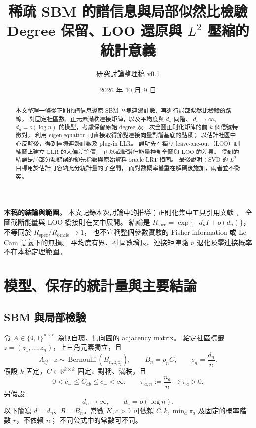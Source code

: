 \documentclass[11pt,a4paper]{article}
\title{\bfseries 稀疏 SBM 的譜信息與局部似然比檢驗\\[7pt]
  \large Degree 保留、LOO 還原與 \(L^2\) 壓縮的統計意義}
\author{研究討論整理稿 \quad v0.1}
\date{2026 年 10 月 9 日}
\theoremstyle{zhplain}
\numberwithin{equation}{section}
\newcommand{\R}{\mathbb R}
\begin{document}
\maketitle
\begin{abstract}
本文整理一條從正則化譜信息還原 SBM 區塊連邊計數、再進行局部似然比檢驗的路線。
對固定社區數、正元素滿秩連接矩陣，以及平均度與 \(d_n\) 同階、
\(d_n\to\infty\)、\(d_n=o(\log n)\) 的模型，考慮保留原始 degree
及一次全圖正則化矩陣的前 \(k\) 個信號特徵對。
利用 eigen-equation 可直接取得節點連接向量對譜基底的點積；
以估計社區中心反解後，得到區塊連邊計數及 plug-in LLR。
證明先在獨立 leave-one-out（LOO）訓練圖上建立 LLR 的大偏差等價，
再以截斷譜行能量控制全圖與 LOO 的差異。
得到的結論是局部分類錯誤的領先指數與原始資料 oracle LRT 相同。
最後說明：SVD 的 \(L^2\) 目標用於估計可容納充分統計量的子空間，
而對數概率權重在解碼後施加，兩者並不衝突。
\end{abstract}

\begin{resultbox}
\textbf{本稿的結論與範圍。}
本文記錄本次討論中的推導；正則化集中工具引用文獻 \cite{LLV}，
全圖截斷能量與 LOO 橋接則在文中展開。
結論是 \(R_{\mathrm{spec}}=\exp\{-d_n I+o(d_n)\}\)，
不等同於 \(R_{\mathrm{spec}}/R_{\mathrm{oracle}}\to1\)，
也不宣稱整個參數實驗的 Fisher information 或 Le Cam 意義下的無損。
平均度有界、社區數增長、連接矩陣隨 \(n\) 退化及零連接概率不在本稿定理範圍。
\end{resultbox}

\clearpage
\tableofcontents
\newpage

\section{模型、保存的統計量與主要結論}
\label{sec:model}

\subsection{SBM 與局部檢驗}
令 \(A\in\{0,1\}^{n\times n}\) 為無自環、無向圖的 adjacency matrix。
給定社區標籤 \(z=(z_1,\ldots,z_n)\)，上三角元素獨立，且
\begin{equation}
 A_{ij}\mid z\sim\operatorname{Bernoulli}(B_{n,z_i z_j}),
 \qquad B_n=\rho_n C,\qquad \rho_n=\frac{d_n}{n}.
 \label{eq:model}
\end{equation}
假設 \(k\) 固定，\(C\in\R^{k\times k}\) 固定、對稱、滿秩，且
\[
 0<c_-\le C_{ab}\le c_+<\infty,\qquad
 \pi_{a,n}:=\frac{n_a}{n}\longrightarrow\pi_a>0.
\]
另假設
\begin{equation}
 d_n\longrightarrow\infty,\qquad d_n=o(\log n).
 \label{eq:sparsity}
\end{equation}
以下簡寫 \(d=d_n\)、\(B=B_n\)。常數 \(K,c>0\) 可依賴
\(C,k,\min_a\pi_a\) 及固定的概率階數 \(r\)，不依賴 \(n\)；
不同公式中的常數可不同。
\end{document}
